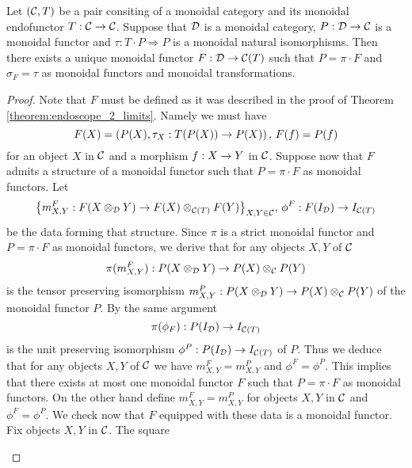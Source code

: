 \begin{theorem}\label{theorem:endoscope_monoidal_2_limit}
Let $({\mathcal C},T)$ be a pair consiting of a monoidal category and its monoidal endofunctor $T:{\mathcal C}\rightarrow {\mathcal C}$. Suppose that ${\mathcal D}$ is a monoidal category, $P:{\mathcal D}\rightarrow {\mathcal C}$ is a monoidal functor and $\tau:T\cdot P \Rightarrow P$ is a monoidal natural isomorphisms. Then there exists a unique monoidal functor $F:{\mathcal D}\rightarrow {\mathcal C}(T)$ such that $P = \pi\cdot F$ and $\sigma_F = \tau$ as monoidal functors and monoidal transformations.
\end{theorem}
\begin{proof}
Note that $F$ must be defined as it was described in the proof of Theorem \ref{theorem:endoscope_2_limits}. Namely we must have
$$F(X) = \left(P(X),\tau_X:T(P(X))\rightarrow P(X)\right),\,F(f) = P(f)$$
for an object $X$ in ${\mathcal C}$ and a morphism $f:X\rightarrow Y$ in ${\mathcal C}$. Suppose now that $F$ admits a structure of a monoidal functor such that $P = \pi\cdot F$ as monoidal functors. Let
$$\big\{m^F_{X,Y}:F(X\otimes_{{\mathcal D}}Y)\rightarrow F(X)\otimes_{{\mathcal C}(T)}F(Y)\big\}_{X,Y\in {\mathcal C}},\,\phi^F:F(I_{{\mathcal D}})\rightarrow I_{{\mathcal C}(T)}$$
be the data forming that structure. Since $\pi$ is a strict monoidal functor and $P = \pi\cdot F$ as monoidal functors, we derive that for any objects $X,Y$ of ${\mathcal C}$
$$\pi(m^F_{X,Y}):P(X\otimes_{{\mathcal D}}Y) \rightarrow P(X)\otimes_{{\mathcal C}}P(Y)$$
is the tensor preserving isomorphism $m^{P}_{X,Y}:P(X\otimes_{{\mathcal D}}Y) \rightarrow P(X)\otimes_{{\mathcal C}}P(Y)$ of the monoidal functor $P$. By the same argument
$$\pi(\phi_F):P(I_{{\mathcal D}})\rightarrow I_{{\mathcal C}(T)}$$
is the unit preserving isomorphism $\phi^{P}:P(I_{{\mathcal D}})\rightarrow I_{{\mathcal C}(T)}$ of $P$. Thus we deduce that for any objects $X,Y$ of ${\mathcal C}$ we have $m^F_{X,Y} = m^{P}_{X,Y}$ and $\phi^F = \phi^{P}$. This implies that there exists at most one monoidal functor $F$ such that $P = \pi\cdot F$ as monoidal functors. On the other hand define $m^F_{X,Y} = m^{P}_{X,Y}$ for objects $X,Y$ in ${\mathcal C}$ and $\phi^F = \phi^{P}$. We check now that $F$ equipped with these data is a monoidal functor. Fix objects $X,Y$ in ${\mathcal C}$. The square
\begin{center}
\end{center}
\end{proof}
